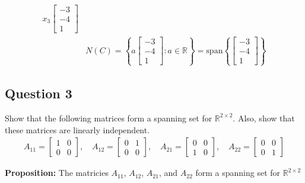 \documentclass{article}
\begin{document}
\begin{align*}
x_{3}\begin{bmatrix} -3 \\ -4 \\ 1 \end{bmatrix}
\\
&N(C) = \left\{a\begin{bmatrix} -3 \\ -4 \\ 1 \end{bmatrix} : a \in \mathbb{R}\right\} =
\text{span}\left\{\begin{bmatrix} -3 \\ -4 \\ 1 \end{bmatrix}\right\}
\end{align*}

\newpage
\subsection*{Question 3}
Show that the following matrices form a spanning set for \(\mathbb{R}^{2 \times 2}\). Also, show that these matrices are linearly independent.
\begin{align*}
A_{11} = \begin{bmatrix} 1 & 0 \\ 0 & 0 \end{bmatrix}, \quad
A_{12} = \begin{bmatrix} 0 & 1 \\ 0 & 0 \end{bmatrix}, \quad
A_{21} = \begin{bmatrix} 0 & 0 \\ 1 & 0 \end{bmatrix}, \quad
A_{22} = \begin{bmatrix} 0 & 0 \\ 0 & 1 \end{bmatrix}
\end{align*}

\noindent
\textbf{Proposition:} The matricies $A_{11}$, $A_{12}$, $A_{21}$, and $A_{22}$ form a spanning set for $\mathbb{R}^{2 \times 2}$
\end{document}
